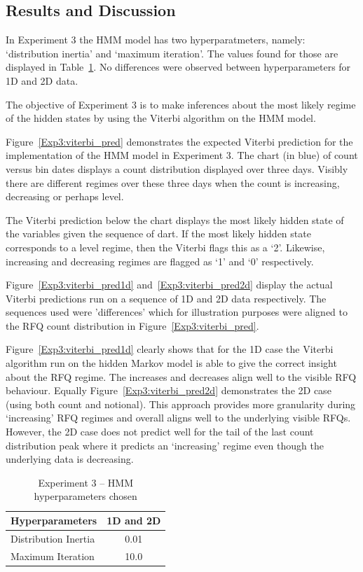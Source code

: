\subsection{Results and Discussion}

In Experiment 3 the HMM model has two hyperparatmeters, namely: `distribution inertia' and `maximum iteration'. The values found for those are displayed in Table~\ref{Ch4Tab:Exp3hyperparams}. No differences were observed between hyperparameters for 1D and 2D data.

The objective of Experiment 3 is to make inferences about the most likely regime of the hidden states by using the Viterbi algorithm on the HMM model.

Figure~\ref{Exp3:viterbi_pred} demonstrates the expected Viterbi prediction for the implementation of the HMM model in Experiment 3. The chart (in blue) of count versus bin dates displays a count distribution displayed over three days. Visibly there are different regimes over these three days when the count is increasing, decreasing or perhaps level. 

The Viterbi prediction below the chart displays the most likely hidden state of the variables given the sequence of dart. If the most likely hidden state corresponds to a level regime, then the Viterbi flags this as a `2'. Likewise, increasing and decreasing regimes are flagged as `1' and `0' respectively.

Figure~\ref{Exp3:viterbi_pred1d} and~\ref{Exp3:viterbi_pred2d} display the actual Viterbi predictions run on a sequence of 1D and 2D data respectively. The sequences used were 'differences' which for illustration purposes were aligned to the RFQ count distribution in Figure~\ref{Exp3:viterbi_pred}. 

Figure~\ref{Exp3:viterbi_pred1d} clearly shows that for the 1D case the Viterbi algorithm run on the hidden Markov model is able to give the correct insight about the RFQ regime. The increases and decreases align well to the visible RFQ behaviour. Equally Figure~\ref{Exp3:viterbi_pred2d} demonstrates the 2D case (using both count and notional). This approach provides more granularity during `increasing' RFQ regimes and overall aligns well to the underlying visible RFQs. However, the 2D case does not predict well for the tail of the last count distribution peak where it predicts an `increasing' regime even though the underlying data is decreasing.

\begin{table}[!ht]\centering\small
    \caption{Experiment 3 -- HMM hyperparameters chosen}\label{Ch4Tab:Exp3hyperparams}
    \begin{tabular}{lc}
        \toprule
            Hyperparameters                  & 1D and 2D \\
        \midrule
            Distribution Inertia                   & 0.01 \\
            Maximum Iteration                     & 10.0 \\
        \bottomrule
    \end{tabular}
\end{table}



